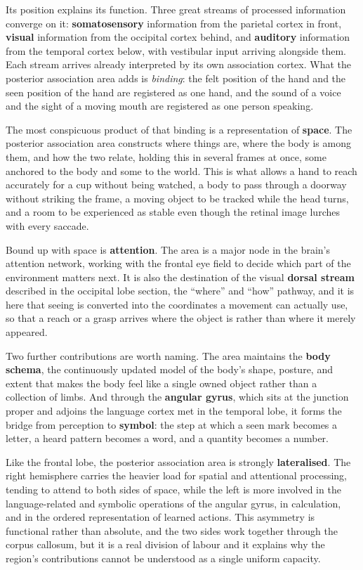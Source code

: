 \documentclass[11pt]{article}
\begin{document}
Its position explains its function. Three great streams of processed information converge on it: \textbf{somatosensory} information from the parietal cortex in front, \textbf{visual} information from the occipital cortex behind, and \textbf{auditory} information from the temporal cortex below, with vestibular input arriving alongside them. Each stream arrives already interpreted by its own association cortex. What the posterior association area adds is \textit{binding}: the felt position of the hand and the seen position of the hand are registered as one hand, and the sound of a voice and the sight of a moving mouth are registered as one person speaking.

The most conspicuous product of that binding is a representation of \textbf{space}. The posterior association area constructs where things are, where the body is among them, and how the two relate, holding this in several frames at once, some anchored to the body and some to the world. This is what allows a hand to reach accurately for a cup without being watched, a body to pass through a doorway without striking the frame, a moving object to be tracked while the head turns, and a room to be experienced as stable even though the retinal image lurches with every saccade.

Bound up with space is \textbf{attention}. The area is a major node in the brain's attention network, working with the frontal eye field to decide which part of the environment matters next. It is also the destination of the visual \textbf{dorsal stream} described in the occipital lobe section, the ``where'' and ``how'' pathway, and it is here that seeing is converted into the coordinates a movement can actually use, so that a reach or a grasp arrives where the object is rather than where it merely appeared.

Two further contributions are worth naming. The area maintains the \textbf{body schema}, the continuously updated model of the body's shape, posture, and extent that makes the body feel like a single owned object rather than a collection of limbs. And through the \textbf{angular gyrus}, which sits at the junction proper and adjoins the language cortex met in the temporal lobe, it forms the bridge from perception to \textbf{symbol}: the step at which a seen mark becomes a letter, a heard pattern becomes a word, and a quantity becomes a number.

Like the frontal lobe, the posterior association area is strongly \textbf{lateralised}. The right hemisphere carries the heavier load for spatial and attentional processing, tending to attend to both sides of space, while the left is more involved in the language-related and symbolic operations of the angular gyrus, in calculation, and in the ordered representation of learned actions. This asymmetry is functional rather than absolute, and the two sides work together through the corpus callosum, but it is a real division of labour and it explains why the region's contributions cannot be understood as a single uniform capacity.
\end{document}
